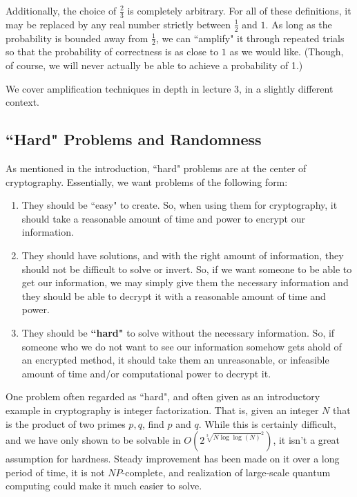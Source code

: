 \documentclass[11pt]{article}
\begin{document}
Additionally, the choice of \(\frac{2}{3}\) is completely arbitrary. For all of these definitions, it may be replaced by any real number strictly between \(\frac{1}{2}\) and \(1\). As long as the probability is bounded away from \(\frac{1}{2}\), we can ``amplify" it through repeated trials so that the probability of correctness is as close to \(1\) as we would like. (Though, of course, we will never actually be able to achieve a probability of 1.)

We cover amplification techniques in depth in lecture 3, in a slightly different context.


\newpage
\subsection{``Hard" Problems and Randomness}

As mentioned in the introduction, ``hard" problems are at the center of cryptography. Essentially, we want problems of the following form: 
\begin{enumerate}
\item They should be ``easy" to create. So, when using them for cryptography, it should take a reasonable amount of time and power to encrypt our information.
\item They should have solutions, and with the right amount of information, they should not be difficult to solve or invert. So, if we want someone to be able to get our information, we may simply give them the necessary information and they should be able to decrypt it with a reasonable amount of time and power.
\item They should be \textbf{``hard"} to solve without the necessary information. So, if someone who we do not want to see our information somehow gets ahold of an encrypted method, it should take them an unreasonable, or infeasible amount of time and/or computational power to decrypt it.
\end{enumerate}

One problem often regarded as ``hard", and often given as an introductory example in cryptography is integer factorization. That is, given an integer \(N\) that is the product of two primes \(p,q\), find \(p\) and \(q\). While this is certainly difficult, and  we have only shown to be solvable in \(O(2^{\sqrt[3]{N\log\log(N)}^2})\), it isn't a great assumption for hardness. Steady improvement has been made on it over a long period of time, it is not \(NP\)-complete, and realization of large-scale quantum computing could make it much easier to solve.\bigskip
\end{document}
